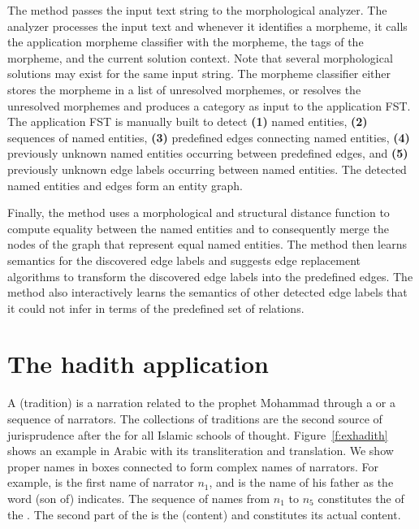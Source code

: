 \documentclass{llncs}
\newcommand{\noArRL}[1]{\arabfalse\RL{#1}\arabtrue}
\newcommand{\noTrRL}[1]{\transfalse\RL{#1}\transtrue}
\begin{document}
The method passes the input text string to the morphological 
analyzer. The analyzer processes the input text and whenever
it identifies a morpheme, it calls the application morpheme
classifier with the morpheme, the tags of the morpheme, 
and the current solution context.
Note that several morphological solutions may exist for the same
input string.
The morpheme classifier either stores the morpheme in a list of
unresolved morphemes, 
or resolves the unresolved morphemes and produces
a category as input to the application FST.
The application FST is manually built to
detect {\bf (1)} named entities,  
{\bf (2)} sequences of named entities,  
{\bf (3)} predefined edges connecting named entities, 
{\bf (4)} previously unknown named entities occurring between predefined edges, 
and {\bf (5)} previously unknown edge labels occurring between named entities.
The detected named entities and edges form an entity graph.

Finally, the method uses a morphological and structural distance
function to compute equality between the named entities and
to consequently merge the nodes of the graph that represent 
equal named entities.
The method then learns semantics for the discovered edge labels 
and suggests edge replacement algorithms to transform the 
discovered edge labels into the predefined edges. 
The method also interactively learns the semantics of other 
detected edge labels that it could not infer 
in terms of the predefined set of relations.



\section{The hadith application}
A  (tradition) 
is a narration related to the prophet Mohammad
through a  or a sequence of narrators. 
The collections of traditions are the second source of
jurisprudence after the  for all Islamic 
schools of thought. 
Figure~\ref{f:exhadith} shows an example \noArRL{.hady_t} in 
Arabic with its transliteration and translation. 
We show proper names in boxes connected
to form complex names of narrators. 
For example, 
\novocalize
\noTrRL{qtybT} is the first name 
of narrator $n_1$, and 
\noTrRL{s`yd} is the name of his father as 
the word \noTrRL{bn} (son of) indicates. 
The sequence of names from $n_1$ to $n_5$ 
constitutes the \noArRL{sanad} 
of the \noArRL{.hady_t}. 
The second part of the \noArRL{.hady_t} is the 
 (content) and constitutes its actual content.
\end{document}
